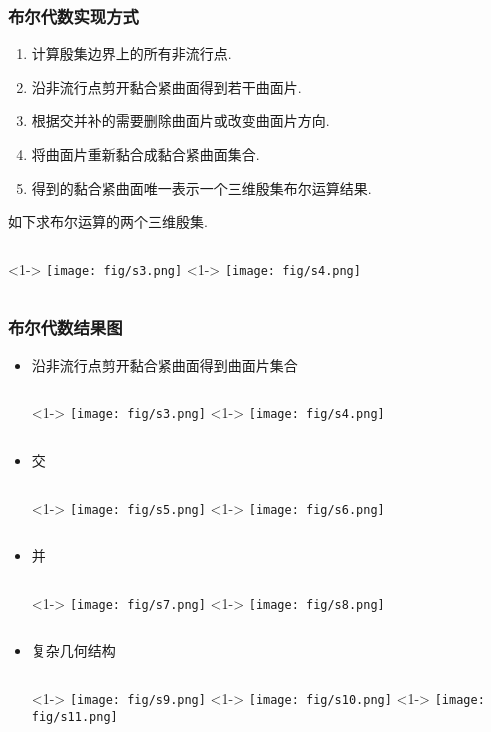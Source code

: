 \documentclass[UTF8]{ctexbeamer}	%
\theoremstyle{plain}
\theoremstyle{definition}
\theoremstyle{remark}
\numberwithin{equation}{section}
\begin{document}
\begin{frame}
    \frametitle{布尔代数实现方式}
    \begin{enumerate}
        \item 计算殷集边界上的所有非流行点.
        \item 沿非流行点剪开黏合紧曲面得到若干曲面片.
        \item 根据交并补的需要删除曲面片或改变曲面片方向.
        \item 将曲面片重新黏合成黏合紧曲面集合.
        \item 得到的黏合紧曲面唯一表示一个三维殷集布尔运算结果.
    \end{enumerate}
    如下求布尔运算的两个三维殷集.
    \begin{columns}
        <1->
            \texttt{[image: fig/s3.png]}
        <1->
        \texttt{[image: fig/s4.png]}
    \end{columns}
\end{frame}

\begin{frame}
    \frametitle{布尔代数结果图}
    \begin{itemize}
        \item 沿非流行点剪开黏合紧曲面得到曲面片集合
        \begin{columns}
            <1->
                \texttt{[image: fig/s3.png]}
            <1->
            \texttt{[image: fig/s4.png]}
        \end{columns}
        \item 交
        \begin{columns}
            <1->
                \texttt{[image: fig/s5.png]}
            <1->
            \texttt{[image: fig/s6.png]}
        \end{columns}
    \end{itemize}
\end{frame}

\begin{frame}
    \begin{itemize}
        \item 并 \begin{columns}
            <1->
                \texttt{[image: fig/s7.png]}
            <1->
            \texttt{[image: fig/s8.png]}
        \end{columns}
        \item 复杂几何结构
        \begin{columns}
            <1->
                \texttt{[image: fig/s9.png]}
            <1->
            \texttt{[image: fig/s10.png]}
            <1->
            \texttt{[image: fig/s11.png]}
        \end{columns}
    \end{itemize}
\end{frame}
\end{document}

